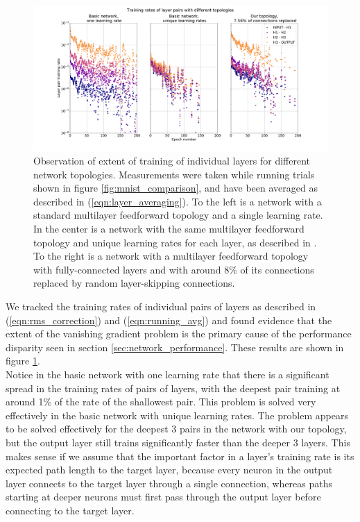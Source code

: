 \documentclass{article}
\newcommand{\npar}{\\\indent}
\begin{document}
\begin{figure}
  \centering
  \includegraphics[width=\textwidth]{figures/MNIST_individual_layers.pdf}
  \caption{Observation of extent of training of individual layers for different network topologies. Measurements were taken while running trials shown in figure \ref{fig:mnist_comparison}, and have been averaged as described in (\ref{eqn:layer_averaging}). To the left is a network with a standard multilayer feedforward topology and a single learning rate. In the center is a network with the same multilayer feedforward topology and unique learning rates for each layer, as described in \cite{scellier17}. To the right is a network with a multilayer feedforward topology with fully-connected layers and with around $8\%$ of its connections replaced by random layer-skipping connections.}
  \label{fig:mnist_layers}
\end{figure}

We tracked the training rates of individual pairs of layers as described in (\ref{eqn:rms_correction}) and (\ref{eqn:running_avg}) and found evidence that the extent of the vanishing gradient problem is the primary cause of the performance disparity seen in section \ref{sec:network_performance}. These results are shown in figure \ref{fig:mnist_layers}.
\npar
Notice in the basic network with one learning rate that there is a significant spread in the training rates of pairs of layers, with the deepest pair training at around 1\% of the rate of the shallowest pair. This problem is solved very effectively in the basic network with unique learning rates. The problem appears to be solved effectively for the deepest 3 pairs in the network with our topology, but the output layer still trains significantly faster than the deeper 3 layers. This makes sense if we assume that the important factor in a layer's training rate is its expected path length to the target layer, because every neuron in the output layer connects to the target layer through a single connection, whereas paths starting at deeper neurons must first pass through the output layer before connecting to the target layer.
\end{document}
